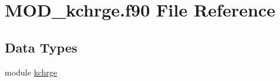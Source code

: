 \hypertarget{MOD__kchrge_8f90}{\section{M\-O\-D\-\_\-kchrge.\-f90 File Reference}
\label{MOD__kchrge_8f90}
}
\subsection*{Data Types}
\begin{DoxyCompactItemize}
\item 
module \hyperlink{classkchrge}{kchrge}
\end{DoxyCompactItemize}
